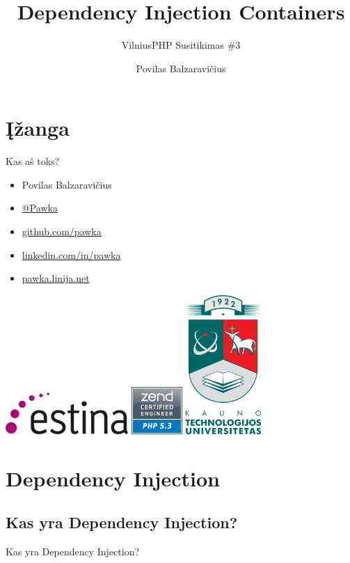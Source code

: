 \documentclass[12pt,a4paper]{beamer}
\author{Povilas Balzaravičius}
\title{Dependency Injection Containers}
\subtitle{VilniusPHP Susitikimas \#3}
\begin{document}
\section{Įžanga}
\begin{frame}
	\titlepage
\end{frame}

\begin{frame}{Kas aš toks?}
    \begin{itemize}
        \item Povilas Balzaravičius
        \item \href{https://twitter.com/pawka}{@Pawka}
        \item \href{https://github.com/pawka}{github.com/pawka}
        \item \href{https://linkedin.com/in/pawka}{linkedin.com/in/pawka}
        \item \href{http://pawka.linija.net}{pawka.linija.net}
    \end{itemize}
    \begin{center}
        \includegraphics[scale=0.4]{img/estina.png}
        \hskip1.5cm
        \includegraphics[scale=0.4]{img/zce.png}
        \hskip1.5cm
        \includegraphics[scale=0.75]{img/ktu.png}
    \end{center}
\end{frame}

\section{Dependency Injection}
\subsection{Kas yra Dependency Injection?}
\begin{frame}
	\begin{center}
        {\Huge Kas yra Dependency Injection?}
	\end{center}
\end{frame}
\end{document}
